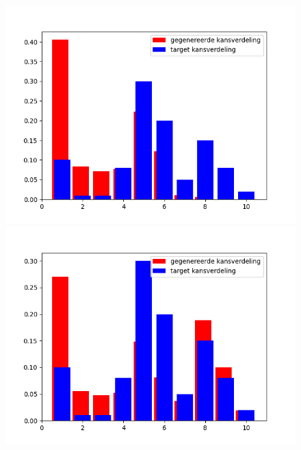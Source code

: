 \begin{figure}
\begin{minipage}{0.49\linewidth}
        \includegraphics[width=\linewidth]{Figures/goede_visualisatie_legende/visualisatie_180.png} 
    \end{minipage}
    \hfill
    \begin{minipage}{0.49\linewidth}
        \includegraphics[width=\linewidth]{Figures/goede_visualisatie_legende/visualisatie_270.png}
    \end{minipage}
    \begin{minipage}{0.49\linewidth}

\end{minipage}
\end{figure}
